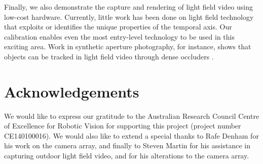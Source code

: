 \documentclass{article} \usepackage{acra}
\begin{document}
Finally, we also demonstrate the capture and rendering of light field video
using low-cost hardware. Currently, little work has been done on light field
technology that exploits or identifies the unique properties of the temporal
axis. Our calibration enables even the most entry-level technology to be used in
this exciting area. Work in synthetic aperture photography, for instance, shows
that objects can be tracked in light field video through dense occluders
\cite{joshi2007synthetic}.

\section*{Acknowledgements}

We would like to express our gratitude to the Australian Research Council Centre
of Excellence for Robotic Vision for supporting this project (project number
CE140100016). We would also like to extend a special thanks to Rafe Denham for
his work on the camera array, and finally to Steven Martin for his assistance in
capturing outdoor light field video, and for his alterations to the camera
array.

{}

\end{document}
